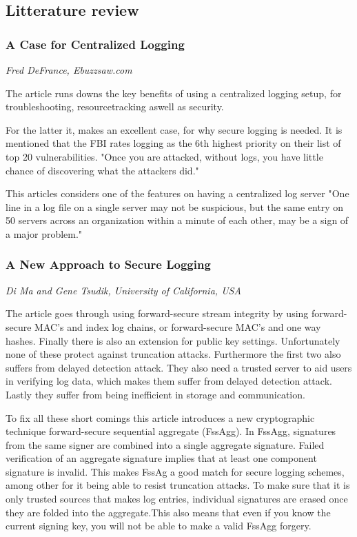 
\subsection{Litterature review}

\subsubsection{A Case for Centralized Logging }
\vspace{-3mm}
{\footnotesize \it Fred DeFrance, Ebuzzsaw.com}~\cite{defrance}

The article runs downs the key benefits of using a centralized logging
setup, for troubleshooting, resourcetracking aswell as security.

For the latter it, makes an excellent case, for why secure logging is
needed. It is mentioned that the FBI rates logging as the 6th highest
priority on their list of top 20 vulnerabilities. "Once you are
attacked, without logs, you have little chance of discovering what the
attackers did."~\cite{defrance}

This articles considers one of the features on having a centralized
log server "One line in a log file on a single server may not be
suspicious, but the same entry on 50 servers across an organization
within a minute of each other, may be a sign of a major
problem."~\cite{defrance}

\subsubsection{A New Approach to Secure Logging}
\vspace{-3mm}
{\footnotesize \it Di Ma and Gene Tsudik, University of California, USA}~\cite{ma}

The article goes through using forward-secure stream integrity by
using forward-secure MAC's and index log chains, or forward-secure
MAC's and one way hashes. Finally there is also an extension for
public key settings. Unfortunately none of these protect against
truncation attacks. Furthermore the first two also suffers from
delayed detection attack. They also need a trusted server to aid users
in verifying log data, which makes them suffer from delayed detection
attack. Lastly they suffer from being inefficient in storage and
communication.

To fix all these short comings this article introduces a new
cryptographic technique forward-secure sequential aggregate
(FssAgg). In FssAgg, signatures from the same signer are combined into
a single aggregate signature. Failed verification of an aggregate
signature implies that at least one component signature is
invalid. This makes FssAg a good match for secure logging schemes,
among other for it being able to resist truncation attacks. To make
sure that it is only trusted sources that makes log entries,
individual signatures are erased once they are folded into the
aggregate.This also means that even if you know the current signing
key, you will not be able to make a valid FssAgg forgery.

